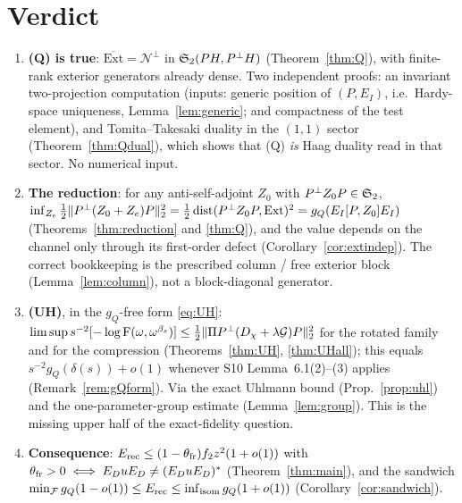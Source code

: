 \documentclass[11pt]{article}
\newcommand{\Stwo}{\mathfrak S_2}\newcommand{\Sone}{\mathfrak S_1}
\newcommand{\norm}[1]{\lVert #1\rVert}\newcommand{\abs}[1]{\lvert #1\rvert}
\newcommand{\Ext}{\mathrm{Ext}}\newcommand{\Nvis}{\mathcal N}
\newcommand{\Erec}{E_{\mathrm{rec}}}\newcommand{\Gs}{\mathcal G}
\DeclareMathOperator{\dist}{dist}\DeclareMathOperator{\Var}{Var}
\begin{document}
\section{Verdict}\label{sec:verdict}

\begin{verdictok}
\begin{enumerate}[leftmargin=1.6em,itemsep=1pt]
\item \textbf{(Q) is true}: $\overline{\Ext}=\Nvis^\perp$ in $\Stwo(PH,\Pperp H)$
 (Theorem~\ref{thm:Q}), with finite-rank exterior generators already dense.  Two independent
 proofs: an invariant two-projection computation (inputs: generic position of $(P,E_I)$, i.e.\
 Hardy-space uniqueness, Lemma~\ref{lem:generic}; and compactness of the test element), and
 Tomita--Takesaki duality in the $(1,1)$ sector (Theorem~\ref{thm:Qdual}), which shows that (Q)
 \emph{is} Haag duality read in that sector.  No numerical input.
\item \textbf{The reduction}: for any anti-self-adjoint $Z_0$ with $\Pperp Z_0P\in\Stwo$,
 $\inf_{Z_e}\tfrac12\norm{\Pperp(Z_0+Z_e)P}_2^2=\tfrac12\dist(\Pperp Z_0P,\Ext)^2
 =g_Q(E_I[P,Z_0]E_I)$ (Theorems~\ref{thm:reduction} and \ref{thm:Q}), and the value depends on the
 channel only through its first-order defect (Corollary~\ref{cor:extindep}).  The correct
 bookkeeping is the prescribed column / free exterior block (Lemma~\ref{lem:column}), not a
 block-diagonal generator.
\item \textbf{(UH)}, in the $g_Q$-free form \eqref{eq:UH}:
 $\limsup s^{-2}[-\log\mathrm F(\omega,\omega^{\beta_s})]\le
 \tfrac12\norm{\Pi\Pperp(D_\chi+\lambda\Gs)P}_2^2$ for the rotated family and for the
 compression (Theorems~\ref{thm:UH}, \ref{thm:UHall}); this equals $s^{-2}g_Q(\delta(s))+o(1)$
 whenever S10 Lemma~6.1(2)--(3) applies (Remark~\ref{rem:gQform}).  Via the exact
 Uhlmann bound (Prop.~\ref{prop:uhl}) and the one-parameter-group estimate
 (Lemma~\ref{lem:group}).  This is the missing upper half of the exact-fidelity question.
\item \textbf{Consequence}: $\Erec\le(1-\theta_{\rm fr})f_2z^2(1+o(1))$ with
 $\theta_{\rm fr}>0\iff E_DuE_D\ne(E_DuE_D)^*$ (Theorem~\ref{thm:main}), and the sandwich
 $\min_\cF g_Q(1-o(1))\le\Erec\le\inf_{\rm isom}g_Q(1+o(1))$ (Corollary~\ref{cor:sandwich}).
\end{enumerate}
\end{verdictok}
\end{document}
